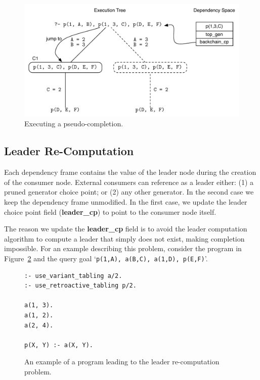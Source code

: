 \begin{figure}[ht]
  \centering
    \includegraphics[scale=0.6]{retro_pseudo_completion2.pdf}
  \caption{Executing a pseudo-completion.}
  \label{fig:retro_pseudo_completion2}
\end{figure}

\subsection{Leader Re-Computation}

Each dependency frame contains the value of the leader node during the creation of the consumer node.
External consumers can reference as a leader either: (1) a pruned generator choice point; or (2) any other generator.
In the second case we keep the dependency frame unmodified. In the first case, we update the leader choice point
field (\textbf{leader\_cp}) to point to the consumer node itself.

The reason we update the \textbf{leader\_cp} field is to avoid the leader computation algorithm to compute
a leader that simply does not exist, making completion impossible.
For an example describing this problem, consider the program in Figure~\ref{fig:retro_leader_program}
and the query goal `\texttt{p(1,A),~a(B,C),~a(1,D),~p(E,F)}'.

\begin{figure}[ht]
\begin{Verbatim}
:- use_variant_tabling a/2.
:- use_retroactive_tabling p/2.

a(1, 3).
a(1, 2).
a(2, 4).

p(X, Y) :- a(X, Y).
\end{Verbatim}
\caption{An example of a program leading to the leader re-computation problem.}
\label{fig:retro_leader_program}
\end{figure}

